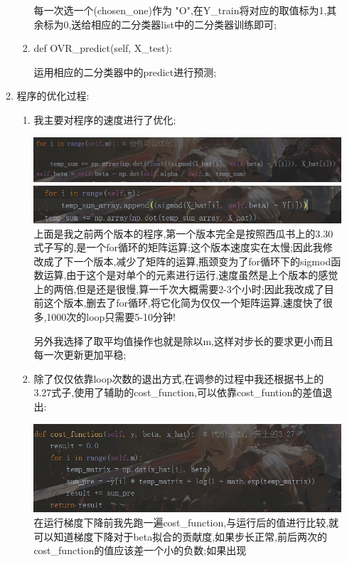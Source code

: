 \documentclass[11pt, a4paper, UTF8]{ctexart}
\begin{document}
\begin{solution}
\begin{enumerate}
\begin{enumerate}
\begin{enumerate}
			每一次选一个(chosen\_one)作为 "O",在Y\_train将对应的取值标为1,其余标为0,送给相应的二分类器list中的二分类器训练即可;
			
			\item def OVR\_predict(self, X\_test):
			
			运用相应的二分类器中的predict进行预测;
			
		\end{enumerate}
	\item 程序的优化过程:
	\begin{enumerate}
		\item 我主要对程序的速度进行了优化;
		
		\includegraphics[scale=0.65]{o1.jpg}\\
		\includegraphics[scale=0.65]{o2.jpg}\\
		
		上面是我之前两个版本的程序,第一个版本完全是按照西瓜书上的3.30式子写的,是一个for循环的矩阵运算;这个版本速度实在太慢;因此我修改成了下一个版本,减少了矩阵的运算,瓶颈变为了for循环下的sigmod函数运算,由于这个是对单个的元素进行运行,速度虽然是上个版本的感觉上的两倍,但是还是很慢,算一千次大概需要2-3个小时;因此我改成了目前这个版本,删去了for循环,将它化简为仅仅一个矩阵运算,速度快了很多,1000次的loop只需要5-10分钟!
		
		另外我选择了取平均值操作也就是除以m,这样对步长的要求更小而且每一次更新更加平稳;
		
		\item 除了仅仅依靠loop次数的退出方式,在调参的过程中我还根据书上的3.27式子,使用了辅助的cost\_function,可以依靠cost\_funtion的差值退出:
		
		\includegraphics[scale=0.65]{cost.jpg}\\
		在运行梯度下降前我先跑一遍cost\_function,与运行后的值进行比较,就可以知道梯度下降对于beta拟合的贡献度,如果步长正常,前后两次的cost\_function的值应该差一个小的负数;如果出现
		

\end{enumerate}
\end{enumerate}
\end{enumerate}
\end{solution}
\end{document}
